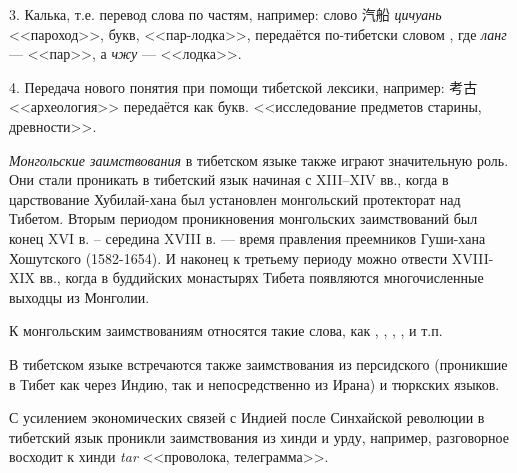 3. Калька, т.е. перевод слова по частям, например: слово {\chinfont 汽船} \textit{цичуань} <<пароход>>, букв, <<пар-лодка>>, передаётся по-тибетски словом , где \textit{ланг} --- <<пар>>, а \textit{чжу} --- <<лодка>>.

4. Передача нового понятия при помощи тибетской лексики, например: {\chinfont 考古}  <<археология>> передаётся как  букв. <<исследование предметов старины, древности>>.

\emph{Монгольские заимствования} в тибетском языке также играют значительную роль. Они стали проникать в тибетский язык начиная с XIII--XIV вв., когда в царствование Хубилай-хана был установлен монгольский протекторат над Тибетом. Вторым периодом проникновения монгольских заимствований был конец XVI в. -- середина XVIII в. --- время правления преемников Гуши-хана Хошутского (1582-1654). И наконец к третьему периоду можно отвести XVIII-XIX вв., когда в буддийских монастырях Тибета появляются многочисленные выходцы из Монголии.

К монгольским заимствованиям относятся такие слова, как , , , ,  и т.п.

В тибетском языке встречаются также заимствования из персидского (проникшие в Тибет как через Индию, так и непосредственно из Ирана) и тюркских языков.

С усилением экономических связей с Индией после Синхайской революции в тибетский язык проникли заимствования из хинди и урду, например, разговорное  восходит к хинди \textit{tar} <<проволока, телеграмма>>.
